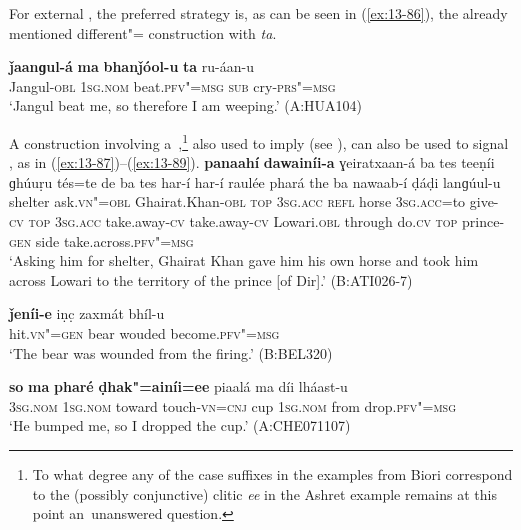 For external , the preferred strategy is, as can be seen in (\ref{ex:13-86}), the already mentioned  different"= construction with \textit{ta}.

\begin{exe}
\ex
\label{ex:13-86}
\gll \textbf{ǰaanɡul-á} \textbf{ma} \textbf{bhanǰóol-u} \textbf{ta} ru-áan-u  \\
Jangul-\textsc{obl} \textsc{1sg.nom} beat.\textsc{pfv"=msg} \textsc{sub} cry-\textsc{prs"=msg}  \\
\glt `Jangul beat me, so therefore I am weeping.' (A:HUA104)
\end{exe}

A construction involving a~,\footnote{To what degree any of the case suffixes in the examples from Biori correspond to the (possibly conjunctive) clitic \textit{ee} in the Ashret example remains at this point an~unanswered question.} also used to imply  (see ), can also be used to signal , as in (\ref{ex:13-87})--(\ref{ex:13-89}).
\ea
\label{ex:13-87}
\gll \textbf{panaahí} \textbf{dawainíi-a} ɣeiratxaan-á ba tes teeṇíi ɡhúuṛu tés=te de ba tes har-í har-í raulée phará the ba nawaab-í ḍáḍi lanɡúul-u \\
shelter ask.\textsc{vn"=obl} Ghairat.Khan-\textsc{obl} \textsc{top} \textsc{3sg.acc} \textsc{refl}  horse \textsc{3sg.acc}=to give-\textsc{cv} \textsc{top} \textsc{3sg.acc} take.away-\textsc{cv} take.away-\textsc{cv} Lowari.\textsc{obl} through do.\textsc{cv} \textsc{top} prince-\textsc{gen} side take.across.\textsc{pfv"=msg} \\
\glt `Asking him for shelter, Ghairat Khan gave him his own horse and took him across Lowari to the territory of the prince [of Dir].' (B:ATI026-7)

\ex
\label{ex:13-88}
\gll \textbf{ǰeníi-e} iṇc̣ zaxmát bhíl-u \\
hit.\textsc{vn"=gen} bear wouded become.\textsc{pfv"=msg} \\
\glt `The bear was wounded from the firing.' (B:BEL320)

\ex
\label{ex:13-89}
\gll \textbf{so} \textbf{ma} \textbf{pharé} \textbf{ḍhak"=ainíi=ee} piaalá ma díi lháast-u\\
\textsc{3sg.nom} \textsc{1sg.nom} toward touch-\textsc{vn=cnj} cup \textsc{1sg.nom} from drop.\textsc{pfv"=msg}\\
\glt `He bumped me, so I dropped the cup.' (A:CHE071107) 
\z

